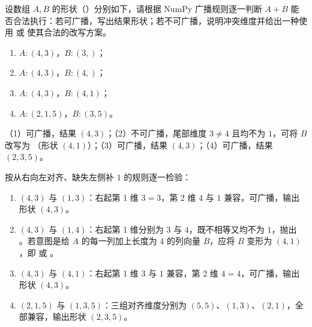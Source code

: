 \begin{exercise}[title={NumPy 广播规则手算判别},level=standard,points=12,tags={NumPy,广播机制}]
设数组 $A, B$ 的形状（）分别如下，请根据 NumPy 广播规则逐一判断 $A + B$ 能否合法执行：若可广播，写出结果形状；若不可广播，说明冲突维度并给出一种使用  或  使其合法的改写方案。
\begin{enumerate}
  \item $A:(4, 3)$，$B:(3,)$；
  \item $A:(4, 3)$，$B:(4,)$；
  \item $A:(4, 3)$，$B:(4, 1)$；
  \item $A:(2, 1, 5)$，$B:(3, 5)$。
\end{enumerate}
\begin{answer}
（1）可广播，结果 $(4, 3)$；（2）不可广播，尾部维度 $3\ne 4$ 且均不为 $1$，可将 $B$ 改写为 （形状 $(4,1)$）；（3）可广播，结果 $(4, 3)$；（4）可广播，结果 $(2, 3, 5)$。
\end{answer}
\begin{solution}
按从右向左对齐、缺失左侧补 $1$ 的规则逐一检验：
\begin{enumerate}
  \item $(4, 3)$ 与 $(1, 3)$：右起第 1 维 $3=3$，第 2 维 $4$ 与 $1$ 兼容，可广播，输出形状 $(4, 3)$。
  \item $(4, 3)$ 与 $(1, 4)$：右起第 1 维分别为 $3$ 与 $4$，既不相等又均不为 $1$，抛出 。若意图是给 $A$ 的每一列加上长度为 $4$ 的列向量 $B$，应将 $B$ 变形为 $(4, 1)$，即  或 。
  \item $(4, 3)$ 与 $(4, 1)$：右起第 1 维 $3$ 与 $1$ 兼容，第 2 维 $4=4$，可广播，输出形状 $(4, 3)$。
  \item $(2, 1, 5)$ 与 $(1, 3, 5)$：三组对齐维度分别为 $(5,5)$、$(1,3)$、$(2,1)$，全部兼容，输出形状 $(2, 3, 5)$。
\end{enumerate}
\end{solution}
\end{exercise}

